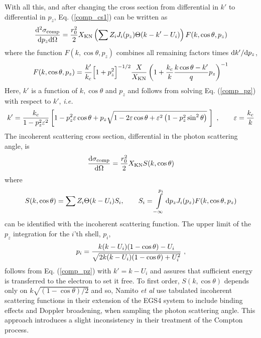 With all this, and after changing the cross section
from differential in $k'$ to differential in $p_z$,
Eq. (\ref{comp_cs1}) can be written as
\begin{equation}
{{\rm d}^2 \sigma_{\rm comp} \over {\rm d}p_z {\rm d}\Omega} =
{r_0^2 \over 2} X_{\rm KN}
\left( \sum Z_i J_i(p_z) \Theta(k - k' - U_i) \right) F(k,\cos \theta, p_z)
\end{equation}
where the function $F(k,\cos \theta, p_z)$ combines all remaining
factors times ${\rm d}k'/{\rm d}p_z$,
\begin{equation}
F(k,\cos \theta, p_z) = \frac{k'}{k_c} \Big[ 1 + p_z^2 \Big]^{-1/2}
\frac{X}{X_{\rm KN}} \left(1 + \frac{k_c}{k} {k \cos \theta - k' \over q} p_z
\right)^{-1}
\end{equation}
Here, $k'$ is a function of $k, \cos \theta$ and $p_z$ and
follows from solving Eq. (\ref{comp_pz}) with respect to $k'$,
{\em i.e.}
\begin{equation}
\label{comp_kprime}
k' = {k_c \over 1 - p_z^2 \varepsilon^2 } \left[
1 - p_z^2 \varepsilon \cos \theta + p_z \sqrt{1 - 2 \varepsilon
\cos \theta + \varepsilon^2 \left(1 - p_z^2 \sin^2 \theta \right) }~ \right]~,
\quad \quad \varepsilon = \frac{k_c}{k}
\end{equation}
The incoherent scattering cross section, differential in
the photon scattering angle, is
\begin{equation}
\label{comp_sig_omega}
{{\rm d} \sigma_{\rm comp} \over {\rm d}\Omega} =
{r_0^2 \over 2}
X_{\rm KN} S(k,\cos \theta)
\end{equation}
where
\begin{equation}
\label{comp_sincoh}
S(k,\cos \theta) =
\sum Z_i \Theta(k - U_i) S_i, \quad \quad
S_i = \int\limits_{-\infty}^{p_i} {\rm d} p_z J_i(p_z)
F(k,\cos \theta, p_z)
\end{equation}
can be identified with the incoherent scattering function.
The upper limit of the $p_z$ integration for the $i$'th shell, $p_i$,
\begin{equation}
\label{comp_pi}
p_i = { k (k - U_i) (1 - \cos \theta) - U_i \over
\sqrt{ 2 k (k - U_i) (1 - \cos \theta) + U_i^2}}~,
\end{equation}
follows from Eq. (\ref{comp_pz}) with
$k' = k - U_i$ and assures that sufficient energy is transferred
to the electron to set it free. To first order, $S(k,\cos \theta)$
depends only on $k \sqrt{(1 - \cos \theta)/2}$ and so,
Namito {\em et al} \cite{Na94} use tabulated
incoherent scattering functions in their
extension of the EGS4 system to include binding effects
and Doppler broadening, when sampling the photon scattering angle.
This approach introduces a slight inconsistency in their treatment
of the Compton process.

